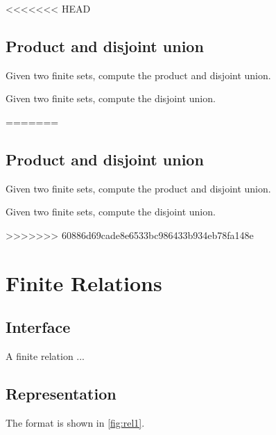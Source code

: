 <<<<<<< HEAD

\subsection{Product and disjoint union}

\begin{exercise}
Given two finite sets, compute the product and disjoint union.

\end{exercise}
\begin{exercise}
Given two finite sets, compute the disjoint union.

=======
\subsection{Product and disjoint union}

\begin{exercise}
Given two finite sets, compute the product and disjoint union.

\end{exercise}
\begin{exercise}
Given two finite sets, compute the disjoint union.

>>>>>>> 60886d69cade8e6533bc986433b934eb78fa148e
\end{exercise}


\section{Finite Relations}

\subsection*{Interface}

A finite relation  ...


\subsection*{Representation}

The format is shown in \cref{fig:rel1}.



\end{exercise}
